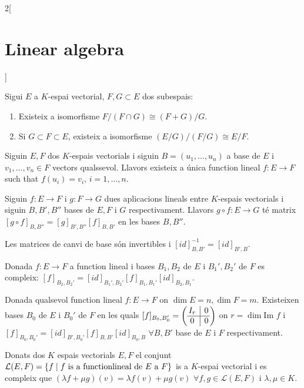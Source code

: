 \documentclass[../../../main.tex]{subfiles}
\begin{document}
\begin{multicols}{2}[\section{Linear algebra}]
\begin{corollary}
\end{corollary}
\begin{theorem}
Sigui $E$ a $K$-espai vectorial, $F,G\subset E$ dos subespais:
\begin{enumerate}
    \item Existeix a isomorfisme $F/(F\cap G)\cong(F+G)/G$.
    \item Si $G\subset F\subset E$, existeix a isomorfisme $(E/G)/(F/G)\cong E/F$.
\end{enumerate}
\end{theorem}
\begin{theorem}
Siguin $E,F$ dos $K$-espais vectorials i siguin $B=(u_1,\ldots,u_n)$ a base de $E$ i $v_1,\ldots,v_n\in F$ vectors qualssevol. Llavors existeix a única function lineal $f:E\rightarrow F$ such that $f(u_i)=v_i$, $i=1,\ldots,n$. 
\end{theorem}
\begin{prop}
Siguin $f:E\rightarrow F$ i $g:F\rightarrow G$ dues aplicacions lineals entre $K$-espais vectorials i siguin $B,B',B''$ bases de $E,F$ i $G$ respectivament. Llavors $g\circ f:E\rightarrow G$ té matrix $[g\circ f]_{B,B''}=[g]_{B',B''}[f]_{B,B'}$ en les bases $B, B''$.
\end{prop}
\begin{corollary}
Les matrices de canvi de base són invertibles i $[id]_{B,B'}^{-1}=[id]_{B',B}$.
\end{corollary}
\begin{prop}
Donada $f:E\rightarrow F$ a function lineal i bases $B_1,B_2$ de $E$ i $B_1',B_2'$ de $F$ es compleix: $[f]_{B_2,B_2'}=[id]_{B_1',B_2'}[f]_{B_1,B_1'}[id]_{B_2,B_1}$.
\end{prop}
\begin{theorem}
Donada qualsevol function lineal $f:E\rightarrow F$ on $\dim E=n, \dim F=m$. Existeixen bases $B_0$ de $E$ i $B_0'$ de $F$ en les quals $[f]_{B_0,B_0'}=\left(\begin{array}{@{\,} c|c @{\,}}
    I_r & 0\\
    \hline
    0 & 0
    \end{array}\right)$ on $r=\dim\text{Im }f$ i $[f]_{B_0,B_0'}=[id]_{B',B_0'}[f]_{B,B'}[id]_{B_0,B}$ $\forall B,B'$ base de $E$ i $F$ respectivament.
\end{theorem}
\begin{lemma}
Donats dos $K$ espais vectorials $E,F$ el conjunt $\mathcal{L}(E,F)=\{f\mid f\text{ is a function}\\ \text{lineal de $E$ a $F$}\}$ is a $K$-espai vectorial i es compleix que $(\lambda f+\mu g)(v)=\lambda f(v)+\mu g(v)$ $\forall f,g\in\mathcal{L}(E,F)$ i $\lambda,\mu\in K$.

\end{lemma}
\end{multicols}
\end{document}
